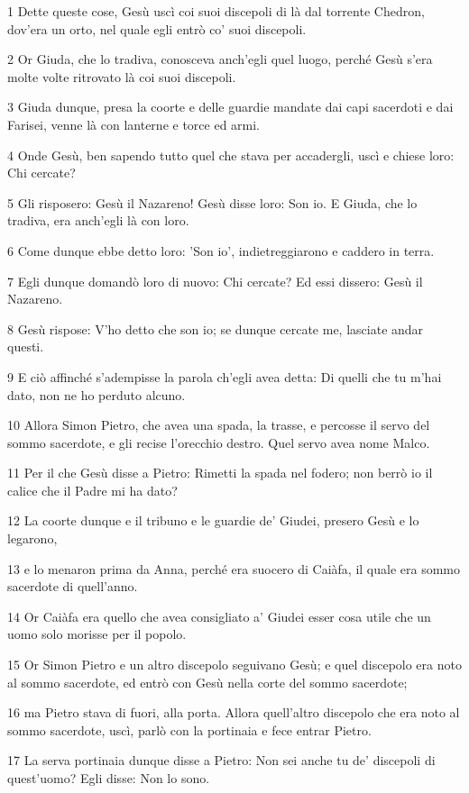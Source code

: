 \par 1 Dette queste cose, Gesù uscì coi suoi discepoli di là dal torrente Chedron, dov'era un orto, nel quale egli entrò co' suoi discepoli.
\par 2 Or Giuda, che lo tradiva, conosceva anch'egli quel luogo, perché Gesù s'era molte volte ritrovato là coi suoi discepoli.
\par 3 Giuda dunque, presa la coorte e delle guardie mandate dai capi sacerdoti e dai Farisei, venne là con lanterne e torce ed armi.
\par 4 Onde Gesù, ben sapendo tutto quel che stava per accadergli, uscì e chiese loro: Chi cercate?
\par 5 Gli risposero: Gesù il Nazareno! Gesù disse loro: Son io. E Giuda, che lo tradiva, era anch'egli là con loro.
\par 6 Come dunque ebbe detto loro: 'Son io', indietreggiarono e caddero in terra.
\par 7 Egli dunque domandò loro di nuovo: Chi cercate? Ed essi dissero: Gesù il Nazareno.
\par 8 Gesù rispose: V'ho detto che son io; se dunque cercate me, lasciate andar questi.
\par 9 E ciò affinché s'adempisse la parola ch'egli avea detta: Di quelli che tu m'hai dato, non ne ho perduto alcuno.
\par 10 Allora Simon Pietro, che avea una spada, la trasse, e percosse il servo del sommo sacerdote, e gli recise l'orecchio destro. Quel servo avea nome Malco.
\par 11 Per il che Gesù disse a Pietro: Rimetti la spada nel fodero; non berrò io il calice che il Padre mi ha dato?
\par 12 La coorte dunque e il tribuno e le guardie de' Giudei, presero Gesù e lo legarono,
\par 13 e lo menaron prima da Anna, perché era suocero di Caiàfa, il quale era sommo sacerdote di quell'anno.
\par 14 Or Caiàfa era quello che avea consigliato a' Giudei esser cosa utile che un uomo solo morisse per il popolo.
\par 15 Or Simon Pietro e un altro discepolo seguivano Gesù; e quel discepolo era noto al sommo sacerdote, ed entrò con Gesù nella corte del sommo sacerdote;
\par 16 ma Pietro stava di fuori, alla porta. Allora quell'altro discepolo che era noto al sommo sacerdote, uscì, parlò con la portinaia e fece entrar Pietro.
\par 17 La serva portinaia dunque disse a Pietro: Non sei anche tu de' discepoli di quest'uomo? Egli disse: Non lo sono.
